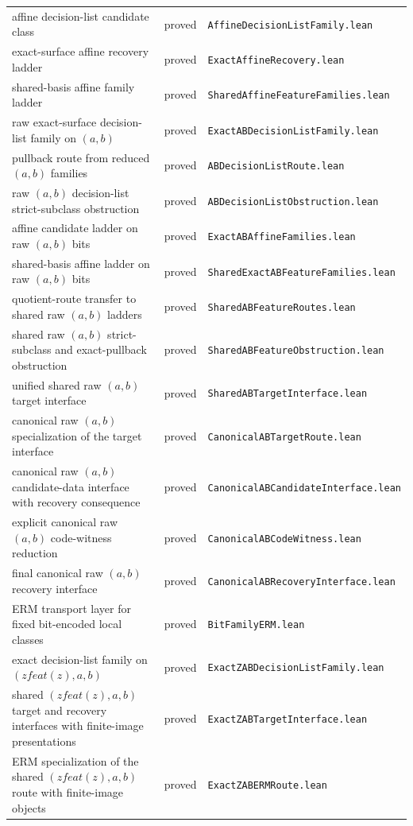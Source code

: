 \documentclass[11pt]{article}
\theoremstyle{remark}
\begin{document}
\begin{center}
\begin{tabular}{lll}
affine decision-list candidate class & proved & \texttt{AffineDecisionListFamily.lean} \\
exact-surface affine recovery ladder & proved & \texttt{ExactAffineRecovery.lean} \\
shared-basis affine family ladder & proved & \texttt{SharedAffineFeatureFamilies.lean} \\
raw exact-surface decision-list family on $(a,b)$ & proved & \texttt{ExactABDecisionListFamily.lean} \\
pullback route from reduced $(a,b)$ families & proved & \texttt{ABDecisionListRoute.lean} \\
raw $(a,b)$ decision-list strict-subclass obstruction & proved & \texttt{ABDecisionListObstruction.lean} \\
affine candidate ladder on raw $(a,b)$ bits & proved & \texttt{ExactABAffineFamilies.lean} \\
shared-basis affine ladder on raw $(a,b)$ bits & proved & \texttt{SharedExactABFeatureFamilies.lean} \\
quotient-route transfer to shared raw $(a,b)$ ladders & proved & \texttt{SharedABFeatureRoutes.lean} \\
shared raw $(a,b)$ strict-subclass and exact-pullback obstruction & proved & \texttt{SharedABFeatureObstruction.lean} \\
unified shared raw $(a,b)$ target interface & proved & \texttt{SharedABTargetInterface.lean} \\
canonical raw $(a,b)$ specialization of the target interface & proved & \texttt{CanonicalABTargetRoute.lean} \\
canonical raw $(a,b)$ candidate-data interface with recovery consequence & proved & \texttt{CanonicalABCandidateInterface.lean} \\
explicit canonical raw $(a,b)$ code-witness reduction & proved & \texttt{CanonicalABCodeWitness.lean} \\
final canonical raw $(a,b)$ recovery interface & proved & \texttt{CanonicalABRecoveryInterface.lean} \\
ERM transport layer for fixed bit-encoded local classes & proved & \texttt{BitFamilyERM.lean} \\
exact decision-list family on $(zfeat(z),a,b)$ & proved & \texttt{ExactZABDecisionListFamily.lean} \\
shared $(zfeat(z),a,b)$ target and recovery interfaces with finite-image presentations & proved & \texttt{ExactZABTargetInterface.lean} \\
ERM specialization of the shared $(zfeat(z),a,b)$ route with finite-image objects & proved & \texttt{ExactZABERMRoute.lean} \\

\end{tabular}
\end{center}
\end{document}
